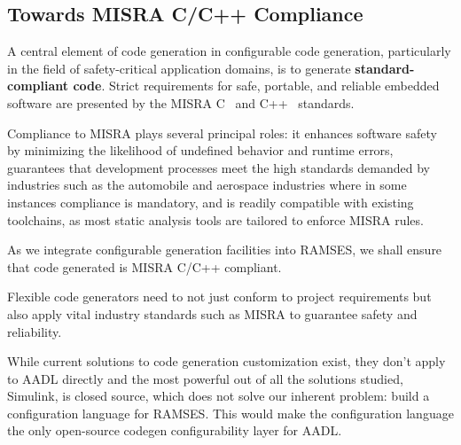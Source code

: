 \subsection*{Towards MISRA C/C++ Compliance}
\label{sec:misra_compliance}

A central element of code generation in configurable code generation, particularly in the field of safety-critical application domains, is to generate \textbf{standard-compliant code}. Strict requirements for safe, portable, and reliable embedded software are presented by the \gls{MISRA} C~\cite{Misra_C_2025} and C++~\cite{Misra_Cpp_2023} standards.
\par
Compliance to \gls{MISRA} plays several principal roles: it enhances software safety by minimizing the likelihood of undefined behavior and runtime errors, guarantees that development processes meet the high standards demanded by industries such as the automobile and aerospace industries where in some instances compliance is mandatory, and is readily compatible with existing toolchains, as most static analysis tools are tailored to enforce \gls{MISRA} rules.
\par
As we integrate configurable generation facilities into \gls{RAMSES}, we shall ensure that code generated is \gls{MISRA} C/C++ compliant.

\begin{tcolorbox}[colback=blue!5, colframe=blue!40!black] Flexible code generators need to not just conform to project requirements but also apply vital industry standards such as \gls{MISRA} to guarantee safety and reliability. \end{tcolorbox}


While current solutions to code generation customization exist, they don't apply to \gls{AADL} directly and the most powerful out of all the solutions studied, Simulink, is closed source, which does not solve our inherent problem: build a configuration language for \gls{RAMSES}. This would make the configuration language the only open-source codegen configurability layer for \gls{AADL}.





